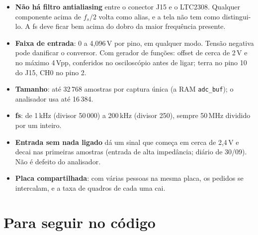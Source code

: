 \documentclass[11pt,a4paper,oneside]{article}
\begin{document}
\begin{itemize}
\item \textbf{Não há filtro antialiasing} entre o conector J15 e o LTC2308.
  Qualquer componente acima de $f_s/2$ volta como alias, e a tela não tem como
  distingui-lo. A fs deve ficar bem acima do dobro da maior frequência
  presente.
\item \textbf{Faixa de entrada}: 0 a 4,096\,V por pino, em qualquer modo.
  Tensão negativa pode danificar o conversor. Com gerador de funções: offset de
  cerca de 2\,V e no máximo 4\,Vpp, conferidos no osciloscópio antes de ligar;
  terra no pino 10 do J15, CH0 no pino 2.
\item \textbf{Tamanho}: até 32\,768 amostras por captura única (a RAM
  \texttt{adc\_buf}); o analisador usa até 16\,384.
\item \textbf{fs}: de 1\,kHz (divisor 50\,000) a 200\,kHz (divisor 250), sempre
  50\,MHz dividido por um inteiro.
\item \textbf{Entrada sem nada ligado} dá um sinal que começa em cerca de
  2,4\,V e decai nas primeiras amostras (entrada de alta impedância; diário de
  30/09). Não é defeito do analisador.
\item \textbf{Placa compartilhada}: com várias pessoas na mesma placa, os
  pedidos se intercalam, e a taxa de quadros de cada uma cai.
\end{itemize}

\section{Para seguir no código}
\end{document}
